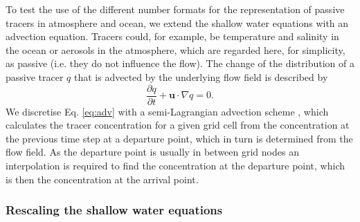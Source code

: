 \documentclass[draft]{agujournal2019}
\begin{document}
To test the use of the different number formats for the representation of passive tracers in atmosphere and ocean, we extend the shallow water equations with an advection equation. Tracers could, for example, be temperature and salinity in the ocean or aerosols in the atmosphere, which are regarded here, for simplicity, as passive (i.e. they do not influence the flow). The change of the distribution of a passive tracer $q$ that is advected by the underlying flow field is described by
\begin{equation}
\frac{\partial q}{\partial t} + \mathbf{u} \cdot \nabla q = 0.
\label{eq:adv}
\end{equation}
We discretise Eq. \ref{eq:adv} with a semi-Lagrangian advection scheme \cite{Smolarkiewicz1992}, which calculates the tracer concentration for a given grid cell from the concentration at the previous time step at a departure point, which in turn is determined from the flow field. As the departure point is usually in between grid nodes an interpolation is required to find the concentration at the departure point, which is then the concentration at the arrival point.

\subsubsection{Rescaling the shallow water equations}
\label{sec:swm_rescale}
\end{document}
